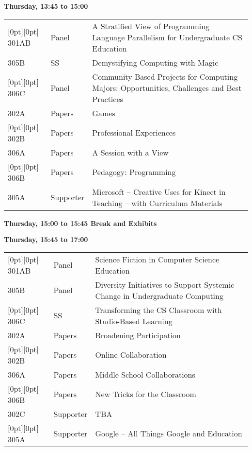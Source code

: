 \noindent
{\sffamily\bfseries Thursday, 13:45 to 15:00}\newline\noindent
\begin{tabular*}{5in}{@{}p{0.5in}@{}p{0.75in}@{}p{3.75in}}

\rowcolor[gray]{0.9}[0pt][0pt] 301AB & Panel & A Stratified View of Programming Language Parallelism for Undergraduate CS Education \\

305B & SS & Demystifying Computing with Magic \\

\rowcolor[gray]{0.9}[0pt][0pt] 306C & Panel & Community-Based Projects for Computing Majors:  Opportunities, Challenges and Best Practices \\

302A & Papers & Games \\

\rowcolor[gray]{0.9}[0pt][0pt] 302B & Papers & Professional Experiences \\

306A & Papers & A Session with a View \\

\rowcolor[gray]{0.9}[0pt][0pt] 306B & Papers & Pedagogy:  Programming \\

305A & Supporter & Microsoft -- Creative Uses for Kinect in Teaching – with Curriculum Materials 
\end{tabular*}
{\sffamily\bfseries Thursday, 15:00 to 15:45 Break and Exhibits}\newline\noindent

\noindent
{\sffamily\bfseries Thursday, 15:45 to 17:00}\newline\noindent
\begin{tabular*}{5in}{@{}p{0.5in}@{}p{0.75in}@{}p{3.75in}}

\rowcolor[gray]{0.9}[0pt][0pt] 301AB & Panel & Science Fiction in Computer Science Education \\

305B & Panel & Diversity Initiatives to Support Systemic Change in Undergraduate Computing \\

\rowcolor[gray]{0.9}[0pt][0pt] 306C & SS & Transforming the CS Classroom with Studio-Based Learning \\

302A & Papers & Broadening Participation \\

\rowcolor[gray]{0.9}[0pt][0pt] 302B & Papers & Online Collaboration \\

306A & Papers & Middle School Collaborations \\

\rowcolor[gray]{0.9}[0pt][0pt] 306B & Papers & New Tricks for the Classroom \\

302C & Supporter & TBA \\

\rowcolor[gray]{0.9}[0pt][0pt] 305A & Supporter & Google -- All Things Google and Education 
\end{tabular*} \newline


